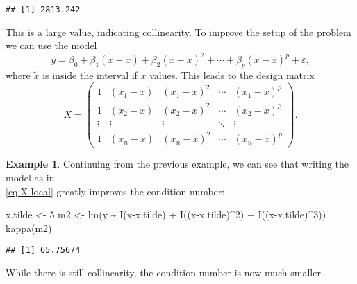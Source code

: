 \documentclass[
  a4paper,
]{article}
\newenvironment{Shaded}{\begin{snugshade}}{\end{snugshade}}
\newcommand{\DecValTok}[1]{\textcolor[rgb]{0.00,0.00,0.81}{#1}}
\newcommand{\FunctionTok}[1]{\textcolor[rgb]{0.00,0.00,0.00}{#1}}
\newcommand{\NormalTok}[1]{#1}
\newcommand{\OtherTok}[1]{\textcolor[rgb]{0.56,0.35,0.01}{#1}}
\newcommand{\SpecialCharTok}[1]{\textcolor[rgb]{0.00,0.00,0.00}{#1}}
\theoremstyle{definition}
\theoremstyle{definition}
\newtheorem{example}{Example}[section]
\theoremstyle{definition}
\theoremstyle{definition}
\theoremstyle{remark}
\begin{document}
\begin{verbatim}
## [1] 2813.242
\end{verbatim}

This is a large value, indicating collinearity. To improve the setup
of the problem we can use the model
\begin{equation*}
  y
  = \beta_0 + \beta_1 (x - \tilde x) + \beta_2 (x - \tilde x)^2 + \cdots + \beta_p (x - \tilde x)^p + \varepsilon,
\end{equation*}
where \(\tilde x\) is inside the interval if \(x\) values.
This leads to the design matrix
\begin{equation}
  X
  = \begin{pmatrix}
      1 & (x_1-\tilde x) & (x_1-\tilde x)^2 & \cdots & (x_1-\tilde x)^p \\
      1 & (x_2-\tilde x) & (x_2-\tilde x)^2 & \cdots & (x_2-\tilde x)^p \\
      \vdots & \vdots & \vdots & \ddots & \vdots \\
      1 & (x_n-\tilde x) & (x_n-\tilde x)^2 & \cdots & (x_n-\tilde x)^p
    \end{pmatrix}.  \label{eq:X-local}
\end{equation}

\begin{example}
Continuing from the previous example, we can see that writing the model as in\\
\eqref{eq:X-local} greatly improves the condition number:

\begin{Shaded}
\begin{Highlighting}[]
\NormalTok{x.tilde }\OtherTok{\textless{}{-}} \DecValTok{5}
\NormalTok{m2 }\OtherTok{\textless{}{-}} \FunctionTok{lm}\NormalTok{(y }\SpecialCharTok{\textasciitilde{}} \FunctionTok{I}\NormalTok{(x}\SpecialCharTok{{-}}\NormalTok{x.tilde) }\SpecialCharTok{+} \FunctionTok{I}\NormalTok{((x}\SpecialCharTok{{-}}\NormalTok{x.tilde)}\SpecialCharTok{\^{}}\DecValTok{2}\NormalTok{) }\SpecialCharTok{+} \FunctionTok{I}\NormalTok{((x}\SpecialCharTok{{-}}\NormalTok{x.tilde)}\SpecialCharTok{\^{}}\DecValTok{3}\NormalTok{))}
\FunctionTok{kappa}\NormalTok{(m2)}
\end{Highlighting}
\end{Shaded}

\begin{verbatim}
## [1] 65.75674
\end{verbatim}

While there is still collinearity, the condition number is now much smaller.
\end{example}
\end{document}
